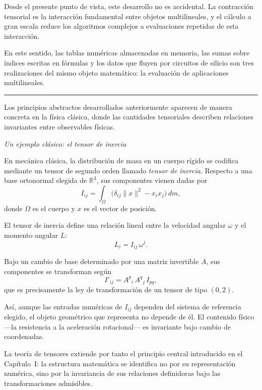 \medskip

Desde el presente punto de vista, este desarrollo no es accidental.
La contracción tensorial es la interacción fundamental entre objetos
multilineales, y el cálculo a gran escala reduce los algoritmos complejos a
evaluaciones repetidas de esta interacción.

\medskip

En este sentido, las tablas numéricas almacenadas en memoria, las sumas sobre
índices escritas en fórmulas y los datos que fluyen por circuitos de silicio
son tres realizaciones del mismo objeto matemático: la evaluación de
aplicaciones multilineales.

\medskip
\hrule
\bigskip

Los principios abstractos desarrollados anteriormente aparecen de manera
concreta en la física clásica, donde las cantidades tensoriales describen
relaciones invariantes entre observables físicas.

\medskip

\textit{Un ejemplo clásico: el tensor de inercia \cite{feynman}}

En mecánica clásica, la distribución de masa en un cuerpo rígido se codifica
mediante un tensor de segundo orden llamado \emph{tensor de inercia}.
Respecto a una base ortonormal elegida de $\mathbb{R}^3$, sus componentes
vienen dadas por
\[
I_{ij} = \int_{\Omega}
\big( \delta_{ij} \|x\|^2 - x_i x_j \big)\, dm,
\]
donde $\Omega$ es el cuerpo y $x$ es el vector de posición.

\medskip

El tensor de inercia define una relación lineal entre la velocidad angular
$\omega$ y el momento angular $L$:
\[
L_i = I_{ij} \, \omega^j.
\]

\medskip

Bajo un cambio de base determinado por una matriz invertible $A$, sus
componentes se transforman según
\[
I'_{ij}
=
A^{p}{}_{i} \,
A^{q}{}_{j} \,
I_{pq},
\]
que es precisamente la ley de transformación de un tensor de tipo $(0,2)$.

\medskip

Así, aunque las entradas numéricas de $I_{ij}$ dependen del sistema de
referencia elegido, el objeto geométrico que representa no depende de él.
El contenido físico ---la resistencia a la aceleración rotacional--- es
invariante bajo cambio de coordenadas.

\medskip

La teoría de tensores extiende por tanto el principio central introducido en
el Capítulo~I: la estructura matemática se identifica no por su representación
numérica, sino por la invariancia de sus relaciones definidoras bajo las
transformaciones admisibles.


